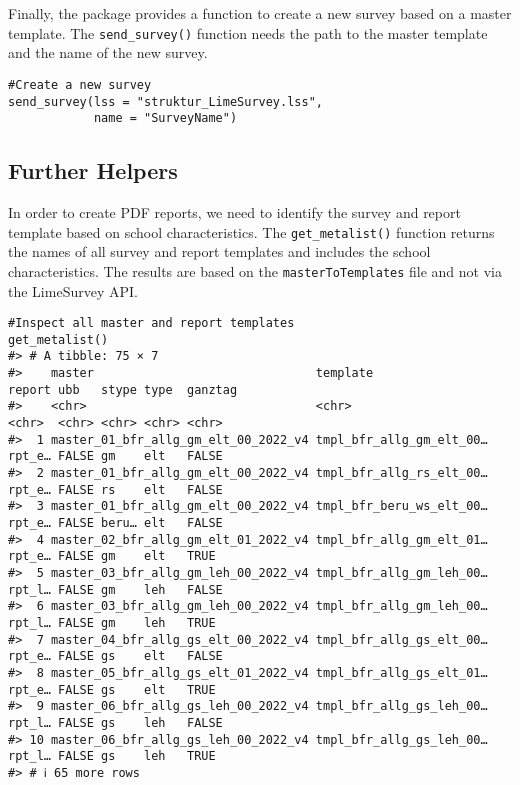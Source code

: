 Finally, the package provides a function to create a new survey based on
a master template. The \texttt{send\_survey()} function needs the path
to the master template and the name of the new survey.

\begin{verbatim}
#Create a new survey
send_survey(lss = "struktur_LimeSurvey.lss",
            name = "SurveyName")
\end{verbatim}

\subsection{Further Helpers}\label{further-helpers}

In order to create PDF reports, we need to identify the survey and
report template based on school characteristics. The
\texttt{get\_metalist()} function returns the names of all survey and
report templates and includes the school characteristics. The results
are based on the \texttt{masterToTemplates} file and not via the
LimeSurvey API.

\begin{verbatim}
#Inspect all master and report templates
get_metalist()
#> # A tibble: 75 × 7
#>    master                               template                 report ubb   stype type  ganztag
#>    <chr>                                <chr>                    <chr>  <chr> <chr> <chr> <chr>  
#>  1 master_01_bfr_allg_gm_elt_00_2022_v4 tmpl_bfr_allg_gm_elt_00… rpt_e… FALSE gm    elt   FALSE  
#>  2 master_01_bfr_allg_gm_elt_00_2022_v4 tmpl_bfr_allg_rs_elt_00… rpt_e… FALSE rs    elt   FALSE  
#>  3 master_01_bfr_allg_gm_elt_00_2022_v4 tmpl_bfr_beru_ws_elt_00… rpt_e… FALSE beru… elt   FALSE  
#>  4 master_02_bfr_allg_gm_elt_01_2022_v4 tmpl_bfr_allg_gm_elt_01… rpt_e… FALSE gm    elt   TRUE   
#>  5 master_03_bfr_allg_gm_leh_00_2022_v4 tmpl_bfr_allg_gm_leh_00… rpt_l… FALSE gm    leh   FALSE  
#>  6 master_03_bfr_allg_gm_leh_00_2022_v4 tmpl_bfr_allg_gm_leh_00… rpt_l… FALSE gm    leh   TRUE   
#>  7 master_04_bfr_allg_gs_elt_00_2022_v4 tmpl_bfr_allg_gs_elt_00… rpt_e… FALSE gs    elt   FALSE  
#>  8 master_05_bfr_allg_gs_elt_01_2022_v4 tmpl_bfr_allg_gs_elt_01… rpt_e… FALSE gs    elt   TRUE   
#>  9 master_06_bfr_allg_gs_leh_00_2022_v4 tmpl_bfr_allg_gs_leh_00… rpt_l… FALSE gs    leh   FALSE  
#> 10 master_06_bfr_allg_gs_leh_00_2022_v4 tmpl_bfr_allg_gs_leh_00… rpt_l… FALSE gs    leh   TRUE   
#> # ℹ 65 more rows
\end{verbatim}
